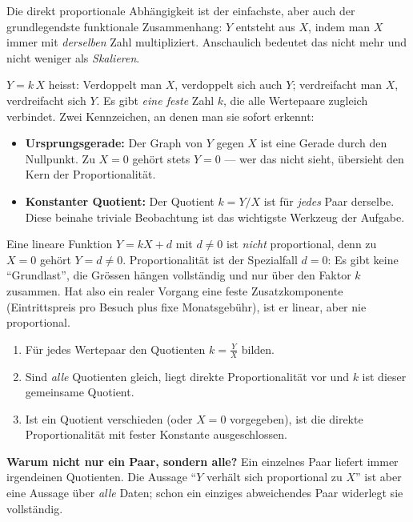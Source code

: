 


Die direkt proportionale Abhängigkeit ist der einfachste, aber auch der
grundlegendste funktionale Zusammenhang: $Y$ entsteht aus $X$, indem man
$X$ immer mit \emph{derselben} Zahl multipliziert. Anschaulich bedeutet
das nicht mehr und nicht weniger als \emph{Skalieren}.

\begin{werkzeugkasten}
$Y=k\,X$ heisst: Verdoppelt man $X$, verdoppelt sich auch $Y$; verdreifacht
man $X$, verdreifacht sich $Y$. Es gibt \emph{eine feste} Zahl $k$, die
alle Wertepaare zugleich verbindet. Zwei Kennzeichen, an denen man sie
sofort erkennt:
\begin{itemize}
  \item \textbf{Ursprungsgerade:} Der Graph von $Y$ gegen $X$ ist eine
        Gerade durch den Nullpunkt. Zu $X=0$ gehört stets $Y=0$ --- wer das
        nicht sieht, übersieht den Kern der Proportionalität.
  \item \textbf{Konstanter Quotient:} Der Quotient $k=Y/X$ ist für
        \emph{jedes} Paar derselbe. Diese beinahe triviale Beobachtung ist
        das wichtigste Werkzeug der Aufgabe.
\end{itemize}
\end{werkzeugkasten}

\begin{werkzeugkasten}
Eine lineare Funktion $Y=kX+d$ mit $d\neq0$ ist \emph{nicht} proportional,
denn zu $X=0$ gehört $Y=d\neq0$. Proportionalität ist der Spezialfall
$d=0$: Es gibt keine ``Grundlast'', die Grössen hängen vollständig und nur
über den Faktor $k$ zusammen. Hat also ein realer Vorgang eine feste
Zusatzkomponente (Eintrittspreis pro Besuch plus fixe Monatsgebühr), ist
er linear, aber nie proportional.
\end{werkzeugkasten}

\begin{werkzeugkasten}
\begin{enumerate}
  \item Für jedes Wertepaar den Quotienten $k=\tfrac{Y}{X}$ bilden.
  \item Sind \emph{alle} Quotienten gleich, liegt direkte Proportionalität
        vor und $k$ ist dieser gemeinsame Quotient.
  \item Ist ein Quotient verschieden (oder $X=0$ vorgegeben), ist die
        direkte Proportionalität mit fester Konstante ausgeschlossen.
\end{enumerate}
\textbf{Warum nicht nur ein Paar, sondern alle?} Ein einzelnes Paar liefert
immer irgendeinen Quotienten. Die Aussage ``$Y$ verhält sich proportional
zu $X$'' ist aber eine Aussage über \emph{alle} Daten; schon ein einziges
abweichendes Paar widerlegt sie vollständig.
\end{werkzeugkasten}

